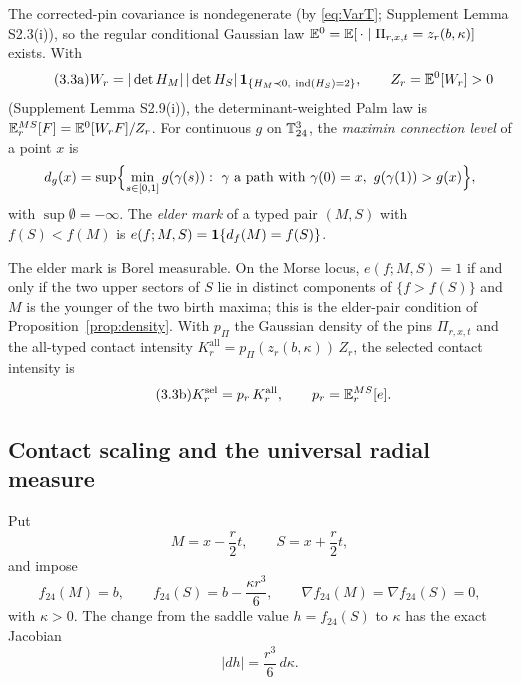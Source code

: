 \begin{definition}\label{def:palm}
The corrected-pin covariance is nondegenerate (by \eqref{eq:VarT}; Supplement Lemma S2.3(i)), so the regular conditional Gaussian law $\mathbb E^0=\mathbb E[\,\cdot\mid\Pi_{r,x,t}=z_r(b,\kappa)]$ exists. With
\begin{equation}\tag{3.3a}
W_r=|\det H_M|\,|\det H_S|\,\mathbf 1_{\{H_M\prec0,\ \operatorname{ind}(H_S)=2\}},\qquad Z_r=\mathbb E^0[W_r]>0
\end{equation}
(Supplement Lemma S2.9(i)), the determinant-weighted Palm law is $\mathbb E^{MS}_r[F]=\mathbb E^0[W_rF]/Z_r$. For continuous $g$ on $\mathbb T^3_{24}$, the \emph{maximin connection level} of a point $x$ is
\[
d_g(x)=\sup\Bigl\{\min_{s\in[0,1]}g(\gamma(s)):\ \gamma\ \text{a path with}\ \gamma(0)=x,\ g(\gamma(1))>g(x)\Bigr\},
\]
with $\sup\emptyset=-\infty$. The \emph{elder mark} of a typed pair $(M,S)$ with $f(S)<f(M)$ is $e(f;M,S)=\mathbf 1\{d_f(M)=f(S)\}$.
\end{definition}

\begin{lemma}\label{lem:measurable}
The elder mark is Borel measurable. On the Morse locus, $e(f;M,S)=1$ if and only if the two upper sectors of $S$ lie in distinct components of $\{f>f(S)\}$ and $M$ is the younger of the two birth maxima; this is the elder-pair condition of Proposition~\ref{prop:density}. With $p_\Pi$ the Gaussian density of the pins $\Pi_{r,x,t}$ and the all-typed contact intensity $K^{\mathrm{all}}_r=p_\Pi(z_r(b,\kappa))\,Z_r$, the selected contact intensity is
\begin{equation}\tag{3.3b}
K^{\mathrm{sel}}_r=p_r\,K^{\mathrm{all}}_r,\qquad p_r=\mathbb E^{MS}_r[e].
\end{equation}
\end{lemma}

\subsection{Contact scaling and the universal radial measure}\label{ssec:contact}

Put
\begin{equation}\tag{3.4}
M=x-\frac r2t,\qquad S=x+\frac r2t,
\end{equation}
and impose
\begin{equation}\tag{3.5}\label{eq:pins}
f_{24}(M)=b,\qquad f_{24}(S)=b-\frac{\kappa r^3}{6},\qquad \nabla f_{24}(M)=\nabla f_{24}(S)=0,
\end{equation}
with $\kappa>0$. The change from the saddle value $h=f_{24}(S)$ to $\kappa$ has the exact Jacobian
\begin{equation}\tag{3.6}
|dh|=\frac{r^3}{6}\,d\kappa .
\end{equation}

